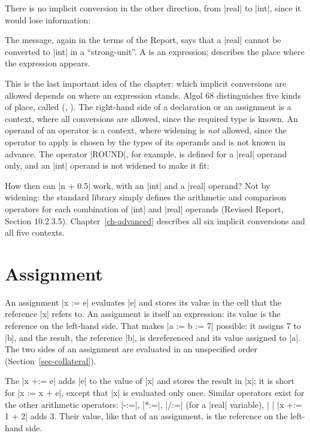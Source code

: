 
There is no implicit conversion in the other direction, from \code|real| to
\code|int|, since it would lose information:


The message, again in the terms of the Report, says that a \code|real|
cannot be converted to \code|int| in a ``strong-unit''. A  is an
expression;  describes the place where the expression appears.

This is the last important idea of the chapter: which implicit
conversions are allowed depends on where an expression stands. Algol 68
distinguishes five kinds of place, called 
(, ). The right-hand side of a
declaration or an assignment is a  context, where all
conversions are allowed, since the required type is known. An operand of
an operator is a  context, where widening is \emph{not}
allowed, since the operator to apply is chosen by the types of its
operands and is not known in advance. The operator \code|ROUND|, for
example, is defined for a \code|real| operand only, and an \code|int|
operand is not widened to make it fit:


How then can \code|n + 0.5| work, with an \code|int| and a \code|real|
operand? Not by widening: the standard library simply defines the
arithmetic and comparison operators for each combination of \code|int| and
\code|real| operands (Revised Report, Section 10.2.3.5). Chapter~\ref{ch-advanced} describes
all six implicit conversions and all five contexts.

\section{Assignment}\label{sec-assignment}

An assignment \code|x := e| evaluates \code|e| and stores its value in
the cell that the reference \code|x| refers to. An assignment is itself
an expression: its value is the reference on the left-hand side. That
makes \code|a := b := 7| possible: it assigns 7 to \code|b|, and the result,
the reference \code|b|, is dereferenced and its value assigned to
\code|a|. The two sides of an assignment are evaluated in an unspecified
order (Section~\ref{sec-collateral}).

The  \code|x +:= e| adds \code|e| to the value
of \code|x| and stores the result in \code|x|; it is short for
\code|x := x + e|, except that \code|x| is evaluated only once. Similar
operators exist for the other arithmetic operators: \code|-:=|,
\code|*:=|, \code|/:=| (for a \code|real| variable), \code|%
\code|%
\code|x +:= 1 + 2| adds 3. Their value, like that of an assignment, is
the reference on the left-hand side.

